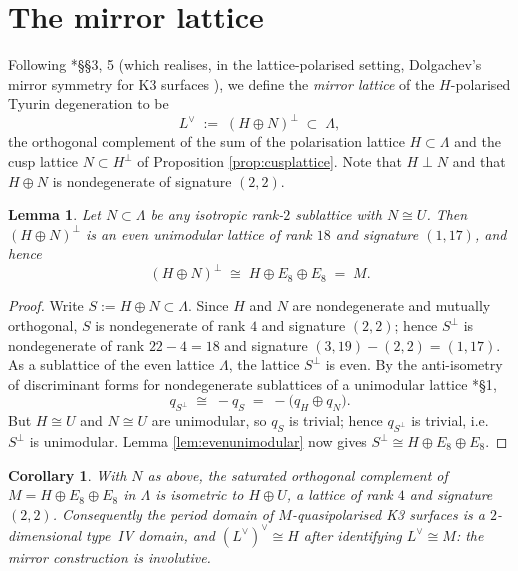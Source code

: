 \documentclass[11pt]{amsart}
\theoremstyle{plain}
\newtheorem{lemma}[theorem]{Lemma}
\newtheorem{corollary}[theorem]{Corollary}
\theoremstyle{definition}
\newcommand{\Lam}{\Lambda}
\begin{document}
\section{The mirror lattice}\label{sec:mirrorlattice}

Following \cite{dfk3slpms}*{\S\S 3, 5} (which realises, in the
lattice-polarised setting, Dolgachev's mirror symmetry for K3 surfaces
\cite{Dol96}), we define the \emph{mirror lattice} of the $H$-polarised Tyurin
degeneration to be
\[
L^\vee \;:=\; (H\oplus N)^\perp\;\subset\;\Lam,
\]
the orthogonal complement of the sum of the polarisation lattice $H\subset\Lam$
and the cusp lattice $N\subset H^\perp$ of
Proposition \ref{prop:cusplattice}. Note that $H\perp N$ and that $H\oplus N$
is nondegenerate of signature $(2,2)$.

\begin{lemma}\label{lem:mirrorlattice}
Let $N\subset\Lam$ be any isotropic rank-$2$ sublattice with $N\cong U$. Then
$(H\oplus N)^\perp$ is an even unimodular lattice of rank $18$ and signature
$(1,17)$, and hence
\[
(H\oplus N)^\perp\;\cong\;H\oplus E_8\oplus E_8\;=\;M.
\]
\end{lemma}

\begin{proof}
Write $S:=H\oplus N\subset\Lam$. Since $H$ and $N$ are nondegenerate and
mutually orthogonal, $S$ is nondegenerate of rank $4$ and signature
$(2,2)$; hence $S^\perp$ is nondegenerate of rank $22-4=18$ and signature
$(3,19)-(2,2)=(1,17)$. As a sublattice of the even lattice $\Lam$, the lattice
$S^\perp$ is even. By the anti-isometry of discriminant forms for nondegenerate
sublattices of a unimodular lattice \cite{Nik80}*{\S 1},
\[
q_{S^\perp}\;\cong\;-q_{S}\;=\;-\bigl(q_H\oplus q_N\bigr).
\]
But $H\cong U$ and $N\cong U$ are unimodular, so $q_S$ is trivial; hence
$q_{S^\perp}$ is trivial, i.e.\ $S^\perp$ is unimodular. Lemma
\ref{lem:evenunimodular} now gives $S^\perp\cong H\oplus E_8\oplus E_8$.
\end{proof}

\begin{corollary}\label{cor:mirrorperioddomain}
With $N$ as above, the saturated orthogonal complement of $M=H\oplus E_8\oplus
E_8$ in $\Lam$ is isometric to $H\oplus U$, a lattice of rank $4$ and
signature $(2,2)$. Consequently the period domain of $M$-quasipolarised K3
surfaces is a $2$-dimensional type~IV domain, and
$(L^\vee)^\vee\cong H$ after identifying $L^\vee\cong M$: the mirror
construction is involutive.
\end{corollary}
\end{document}
